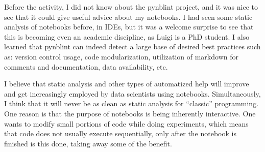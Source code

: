 \documentclass[11pt]{article}
\begin{document}
Before the activity, I did not know about the pynblint project, and it was nice to see that it could give useful advice about my notebooks. 
I had seen some static analysis of notebooks before, in IDEs, but it was a welcome surprise to see that this is becoming even an academic discipline, as Luigi is a PhD student.
I also learned that pynblint can indeed detect a large base of desired best practices such as: version control usage, code modularization, utilization of markdown for comments and documentation, data availability, etc.

I believe that static analysis and other types of automatized help will improve and get increasingly employed by data scientists using notebooks. 
Simultaneously, I think that it will never be as clean as static analysis for ``classic'' programming.
One reason is that the purpose of notebooks is being inherently interactive.
One wants to modify small portions of code while doing experiments, which means that code does not usually execute sequentially, only after the notebook is finished is this done, taking away some of the benefit. 
\end{document}
